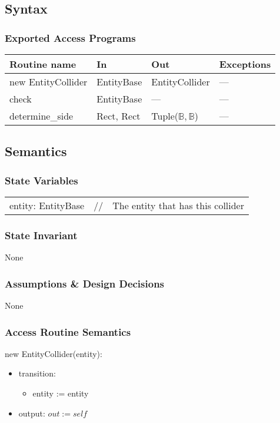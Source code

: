 \documentclass[12pt]{article}
\begin{document}
\subsection* {Syntax}

\subsubsection* {Exported Access Programs}

\begin{tabular}{| l | l | l | l |}
\hline
\textbf{Routine name} & \textbf{In} & \textbf{Out} & \textbf{Exceptions}\\
\hline
new EntityCollider & EntityBase & EntityCollider & ---\\
\hline
check & EntityBase & --- & ---\\
\hline
determine\_side & Rect, Rect & Tuple($\mathbb{B,B}$) & ---\\
\hline
\end{tabular}

\subsection* {Semantics}

\subsubsection* {State Variables}
\begin{tabular}{lll}
entity: EntityBase & // & The entity that has this collider
\end{tabular}

\subsubsection* {State Invariant}

None

\subsubsection* {Assumptions \& Design Decisions}

None

\subsubsection* {Access Routine Semantics}

new EntityCollider(entity):
\begin{itemize}
    \item transition: 
    \begin{itemize}[]
        \item entity := entity
    \end{itemize}
    \item output: $out := self$
\end{itemize}
\end{document}
